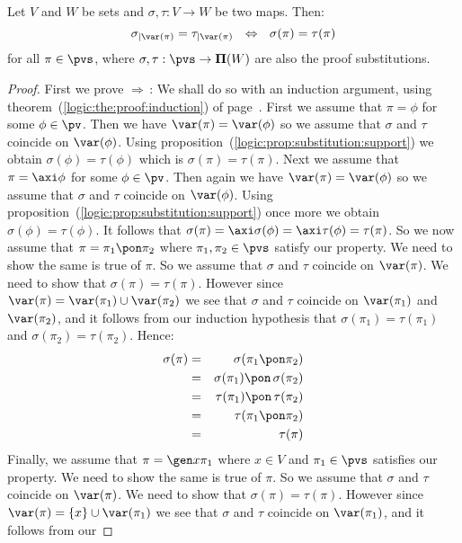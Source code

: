\begin{prop}\label{logic:prop:FUAP:variable:support}
Let $V$ and $W$ be sets and $\sigma,\tau:V\to W$ be two maps. Then:
    \[
    \sigma_{|\var(\pi)}=\tau_{|\var(\pi)}\ \ \Leftrightarrow\
    \ \sigma(\pi)=\tau(\pi)
    \]
for all $\pi\in\pvs$, where $\sigma,\tau:\pvs\to{\bf\Pi}(W)$ are
also the proof substitutions.
\end{prop}
\begin{proof}
First we prove $\Rightarrow$\,: We shall do so with an induction
argument, using theorem~(\ref{logic:the:proof:induction}) of
page~\pageref{logic:the:proof:induction}. First we assume that
$\pi=\phi$ for some $\phi\in\pv$. Then we have
$\var(\pi)=\var(\phi)$ so we assume that $\sigma$ and $\tau$
coincide on $\var(\phi)$. Using
proposition~(\ref{logic:prop:substitution:support}) we obtain
$\sigma(\phi)=\tau(\phi)$ which is $\sigma(\pi)=\tau(\pi)$. Next we
assume that $\pi=\axi\phi$ for some $\phi\in\pv$. Then again we have
$\var(\pi)=\var(\phi)$ so we assume that $\sigma$ and $\tau$
coincide on $\var(\phi)$. Using
proposition~(\ref{logic:prop:substitution:support}) once more we
obtain $\sigma(\phi)=\tau(\phi)$. It follows that
$\sigma(\pi)=\axi\sigma(\phi)=\axi\tau(\phi)=\tau(\pi)$. So we now
assume that $\pi=\pi_{1}\pon\pi_{2}$ where $\pi_{1},\pi_{2}\in\pvs$
satisfy our property. We need to show the same is true of $\pi$. So
we assume that $\sigma$ and $\tau$ coincide on $\var(\pi)$. We need
to show that $\sigma(\pi)=\tau(\pi)$. However since
$\var(\pi)=\var(\pi_{1})\cup\var(\pi_{2})$ we see that $\sigma$ and
$\tau$ coincide on $\var(\pi_{1})$ and $\var(\pi_{2})$, and it
follows from our induction hypothesis that
$\sigma(\pi_{1})=\tau(\pi_{1})$ and $\sigma(\pi_{2})=\tau(\pi_{2})$.
Hence:
    \begin{eqnarray*}
    \sigma(\pi)&=&\sigma(\pi_{1}\pon\pi_{2})\\
    &=&\sigma(\pi_{1})\pon\,\sigma(\pi_{2})\\
    &=&\tau(\pi_{1})\pon\,\tau(\pi_{2})\\
    &=&\tau(\pi_{1}\pon\pi_{2})\\
    &=&\tau(\pi)
    \end{eqnarray*}
Finally, we assume that $\pi=\gen x\pi_{1}$ where $x\in V$ and
$\pi_{1}\in\pvs$ satisfies our property. We need to show the same is
true of $\pi$. So we assume that $\sigma$ and $\tau$ coincide on
$\var(\pi)$. We need to show that $\sigma(\pi)=\tau(\pi)$. However
since $\var(\pi)=\{x\}\cup\var(\pi_{1})$ we see that $\sigma$ and
$\tau$ coincide on $\var(\pi_{1})$, and it follows from our

\end{proof}
